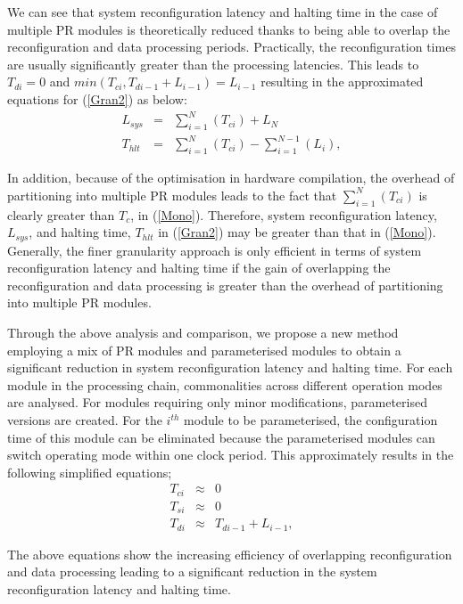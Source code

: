 We can see that system reconfiguration latency and halting time in the case of multiple PR modules is theoretically reduced thanks to being able to overlap the reconfiguration and data processing periods. Practically, the reconfiguration times are usually significantly greater than the processing latencies. This leads to $T_{di} = 0$ and  $min(T_{ci}, T_{di-1}+L_{i-1}) = L_{i-1}$ resulting in the approximated equations for (\ref{Gran2}) as below:
\begin{eqnarray}
\label{Gran3}
L_{sys} &= & \sum_{i = 1}^{N}(T_{ci}) + L_{N}    \nonumber \\
T_{hlt} &=  &\sum_{i = 1}^{N}(T_{ci})  -  \sum_{i = 1}^{N-1}  (L_{i}),
\end{eqnarray}

In addition, because of the optimisation in hardware compilation, the overhead of partitioning into multiple PR modules leads to the fact that $\sum_{i = 1}^{N}(T_{ci})$ is clearly greater than $T_{c}$, in (\ref{Mono}). Therefore, system reconfiguration latency, $L_{sys}$, and halting time, $T_{hlt}$ in (\ref{Gran2}) may be greater than that in (\ref{Mono}).
Generally, the finer granularity approach is only efficient in terms of system reconfiguration latency and halting time if the gain of overlapping the reconfiguration and data processing is greater than the overhead of partitioning into multiple PR modules.

Through the above analysis and comparison, we propose a new method employing a mix of PR modules and parameterised modules to obtain a significant reduction in system reconfiguration latency and halting time. For each module in the processing chain, commonalities across different operation modes are analysed. For modules requiring only minor modifications, parameterised versions are created.
For the $i^{th}$ module to be parameterised, the configuration time of this module can be eliminated because the parameterised modules can switch operating mode within one clock period. This approximately results in the following simplified equations;
\begin{eqnarray}
\label{Pro}
T_{ci} &\approx & 0   \nonumber \\
T_{si} &\approx & 0 \nonumber \\
T_{di} &\approx & T_{di-1} +  L_{i-1},
\end{eqnarray}

The above equations show the increasing efficiency of overlapping reconfiguration and data processing leading to a significant reduction in the system reconfiguration latency and halting time.

